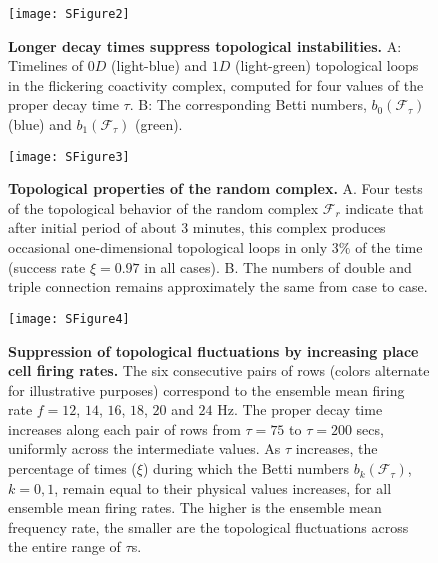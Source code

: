 \documentclass[12pt,tightenlines]{revtex4}
\begin{document}
\begin{figure}[ht]
\texttt{[image: SFigure2]}
\caption{{\footnotesize \textbf{Longer decay times suppress topological instabilities.} A: Timelines of $0D$ 
(light-blue) and $1D$ (light-green) topological loops in the flickering coactivity complex, computed for four values of the proper 
decay time $\tau$. B: The corresponding Betti numbers, $b_0(\mathcal{F}_{\tau})$ (blue) and $b_1(\mathcal{F}_{\tau})$ (green).}}
\label{SFigure2}
\end{figure} 

\begin{figure}[ht]
\texttt{[image: SFigure3]}
\caption{{\footnotesize \textbf{Topological properties of the random complex.} A. Four tests of the 
topological behavior of the random complex $\mathcal{F}_r$ indicate that after initial period of about $3$ minutes, 
this complex produces occasional one-dimensional topological loops in only $3\%$ of the time (success rate $\xi = 0.97$ 
in all cases). B. The numbers of double and triple connection remains approximately the same from case to case.}}
\label{SFigure3}
\end{figure} 


\begin{figure}[ht] 
\texttt{[image: SFigure4]}
\caption{{\footnotesize \textbf{Suppression of topological fluctuations by increasing place cell firing rates.} The six consecutive 
pairs of rows (colors alternate for illustrative purposes) correspond to the ensemble mean firing rate $f = 12$, 
$14$, $16$, $18$, $20$ and $24$ Hz. The proper decay time increases along each pair of rows from $\tau = 75$ 
to $\tau = 200$ secs, uniformly across the intermediate values. As $\tau$ increases, the percentage of times ($\xi$) 
during which the Betti numbers $b_k(\mathcal{F}_{\tau})$, $k = 0, 1$, remain equal to their physical values increases, 
for all ensemble mean firing rates. The higher is the ensemble mean frequency rate, the smaller are the topological 
fluctuations across the entire range of $\tau$s.}}
\label{SFigure4}
\end{figure} 
\end{document}
